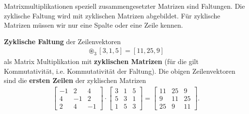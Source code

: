 \newpage
\begin{ExCalc}
Matrixmultiplikationen speziell zusammengesetzter Matrizen sind Faltungen.
Die zyklische Faltung wird mit zyklischen Matrizen abgebildet.
Für zyklische Matrizen müssen wir nur eine Spalte oder eine Zeile kennen.

\textbf{Zyklische Faltung} der Zeilenvektoren
\begin{align}
[-1,2,4] \circledast_3 [3,1,5] = [11,25,9]
\end{align}
als Matrix Multiplikation mit \textbf{zyklischen Matrizen} (für die gilt Kommutativität, i.e.
Kommutativität der Faltung).
Die obigen Zeilenvektoren sind die \textbf{ersten Zeilen} der zyklischen Matrizen
\begin{align}
\begin{bmatrix}
-1 &  2 &  4\\
 4 & -1 &  2\\
 2 &  4 & -1
\end{bmatrix}
\cdot
\begin{bmatrix}
3 & 1 & 5\\
5 & 3 & 1\\
1 & 5 & 3
\end{bmatrix}
=
\begin{bmatrix}
11  &  25  &   9\\
 9  &  11  &  25\\
25  &   9  &  11
\end{bmatrix}.
\end{align}


\end{ExCalc}
